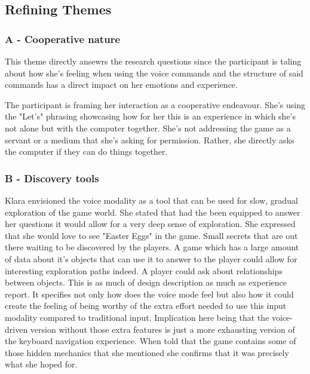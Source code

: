 \subsection{Refining Themes}

\subsubsection{A - Cooperative nature}
This theme directly ansewrs the research questions since the participant is taling about how she's feeling when using the voice commands and the structure of said commands has a direct impact on her emotions and experience.

The participant is framing her interaction as a cooperative endeavour. She's using the "Let's" phrasing showcasing how for her this is an experience in which she's not alone but with the computer together. She's not addressing the game as a servant or a medium that she's asking for permission. Rather, she directly asks the computer if they can do things together.

\subsubsection{B - Discovery tools}

Klara envisioned the voice modality as a tool that can be used for slow, gradual exploration of the game world. She stated that had the been equipped to answer her questions it would allow for a very deep sense of exploration. 
She expressed that she would love to see "Easter Eggs" in the game. Small secrets that are out there waiting to be discovered by the players. A game which has a large amount of data about it's objects that can use it to answer to the player could allow for interesting exploration paths indeed. A player could ask about relationships between objects. This is as much of design description as much as experience report. It specifies not only how does the voice mode feel but also how it could create the feeling of being worthy of the extra effort needed to use this input modality compared to traditional input. Implication here being that the voice-driven version without those extra features is just a more exhausting version of the keyboard navigation experience. When told that the game contains some of those hidden mechanics that she mentioned she confirms that it was precisely what she hoped for. 

